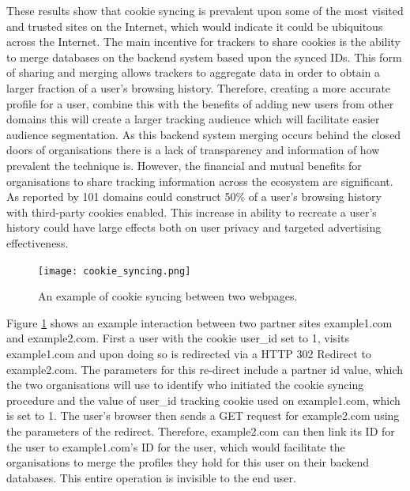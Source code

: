 \documentclass[12pt]{article}
\begin{document}
These results show that cookie syncing is prevalent upon some of the most visited and trusted sites on the Internet, which would indicate it could be ubiquitous across the Internet. The main incentive for trackers to share cookies is the ability to merge databases on the backend system based upon the synced IDs. This form of sharing and merging allows trackers to aggregate data in order to obtain a larger fraction of a user's browsing history. Therefore, creating a more accurate profile for a user, combine this with the benefits of adding new users from other domains this will create a larger tracking audience which will facilitate easier audience segmentation. As this backend system merging occurs behind the closed doors of organisations there is a lack of transparency and information of how prevalent the technique is.  However, the financial and mutual benefits for organisations to share tracking information across the ecosystem are significant. As reported by \parencite{webNeverForgets}  101 domains could construct 50\% of a user's browsing history with third-party cookies enabled. This increase in ability to recreate a user's history could have large effects both on user privacy and targeted advertising effectiveness. \newline

\begin{figure}[H]
    \centering
    \texttt{[image: cookie\_syncing.png]}
    \caption{An example of cookie syncing between two webpages.}
    \label{fig:cookie_syncing}
\end{figure}

Figure \ref{fig:cookie_syncing} shows an example interaction between two partner sites example1.com and example2.com. First a user with the cookie user\_id set to 1, visits example1.com and upon doing so is redirected via a HTTP 302 Redirect to example2.com. The parameters for this re-direct include a partner id value, which the two organisations will use to identify who initiated the cookie syncing procedure and the value of user\_id tracking cookie used on example1.com, which is set to 1. The user's browser then sends a GET request for example2.com using the parameters of the redirect. Therefore, example2.com can then link its ID for the user to example1.com’s ID for the user, which would facilitate the organisations to merge the profiles they hold for this user on their backend databases. This entire operation is invisible to the end user. \\
\end{document}
